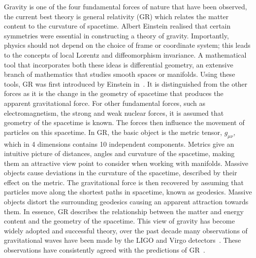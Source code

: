 \documentclass[10pt]{report}
\theoremstyle{definition}
\begin{document}
Gravity is one of the four fundamental forces of nature that have been observed, the current best theory is general relativity (GR) which relates the matter content to the curvature of spacetime. Albert Einstein realised that certain symmetries were essential in constructing a theory of gravity. Importantly, physics should not depend on the choice of frame or coordinate system; this leads to the concepts of local Lorentz and diffeomorphism invariance. A mathematical tool that incorporates both these ideas is differential geometry, an extensive branch of mathematics that studies smooth spaces or manifolds. Using these tools, GR was first introduced by Einstein in~\cite{Die_Grundlage_d_Einste_1916,AEinsteinTheoryGravitation1915}. It is distinguished from the other forces as it is the change in the geometry of spacetime that produces the apparent gravitational force. For other fundamental forces, such as electromagnetism, the strong and weak nuclear forces, it is assumed that geometry of the spacetime is known. The forces then influence the movement of particles on this spacetime. In GR, the basic object is the metric tensor, $g_{\mu\nu}$, which in 4 dimensions contains 10 independent components. Metrics give an intuitive picture of distances, angles and curvature of the spacetime, making them an attractive view point to consider when working with manifolds. Massive objects cause deviations in the curvature of the spacetime, described by their effect on the metric. The gravitational force is then recovered by assuming that particles move along the shortest paths in spacetime, known as geodesics. Massive objects distort the surrounding geodesics causing an apparent attraction towards them. In essence, GR describes the relationship between the matter and energy content and the geometry of the spacetime. This view of gravity has become widely adopted and successful theory, over the past decade many observations of gravitational waves have been made by the LIGO and Virgo detectors~\cite{Observation_of_Collab_2016,GWTC_1_A_Gravi_Abbott_2019}. These observations have consistently agreed with the predictions of GR~\cite{Will2006}.
\end{document}
